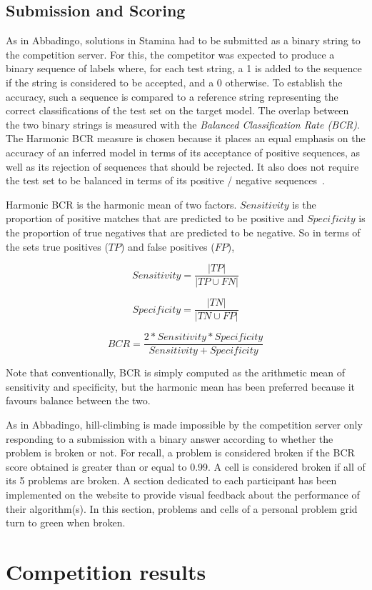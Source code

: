 \subsection{Submission and Scoring}

As in Abbadingo, solutions in Stamina had to be submitted as a binary string to the competition server. For this, the competitor was expected to produce a binary sequence of labels where, for each test string, a 1 is added to the sequence if the string is considered to be accepted, and a 0 otherwise. To establish the accuracy, such a sequence is compared to a reference string representing the correct classifications of the test set on the target model. The overlap between the two binary strings is measured with the \emph{Balanced Classification Rate (BCR)}. The Harmonic BCR measure is chosen because it places an equal emphasis on the accuracy of an inferred model in terms of its acceptance of positive sequences, as well as its rejection of sequences that should be rejected. It also does not require the test set to be balanced in terms of its positive / negative sequences~\cite{Walkinshaw2008}. 

Harmonic BCR is the harmonic mean of two factors. $Sensitivity$ is the proportion of positive matches that are predicted to be positive and $Specificity$ is the proportion of true negatives that are predicted to be negative. So in terms of the sets true positives ($TP$) and false positives ($FP$), 

$$Sensitivity=\frac{|TP|}{|TP \cup FN|}$$ 

$$Specificity=\frac{|TN|}{|TN \cup FP|}$$

$$BCR=\frac{2*Sensitivity*Specificity}{Sensitivity + Specificity}$$

Note that conventionally, BCR is simply computed as the arithmetic mean of sensitivity and specificity, but the harmonic mean has been preferred because it favours balance between the two.

As in Abbadingo, hill-climbing is made impossible by the competition server only responding to a submission with a binary answer according to whether the problem is broken or not. For recall, a problem is considered broken if the BCR score obtained is greater than or equal to 0.99. A cell is considered broken if all of its 5 problems are broken. A section dedicated to each participant has been implemented on the website to provide visual feedback about the performance of their algorithm(s). In this section, problems and cells of a personal problem grid turn to green when broken.


\section{Competition results\label{section:stamina-results}}



